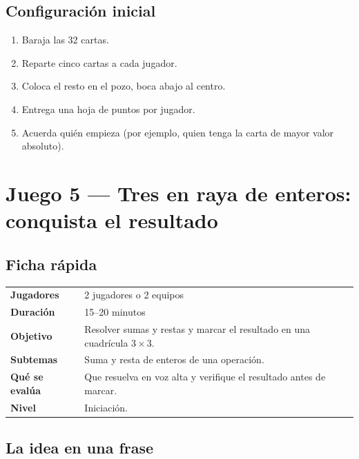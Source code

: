 \documentclass[12pt, letterpaper]{article}
\begin{document}
\subsection{Configuración inicial}

\begin{enumerate}[leftmargin=*]
  \item Baraja las 32 cartas.
  \item Reparte cinco cartas a cada jugador.
  \item Coloca el resto en el pozo, boca abajo al centro.
  \item Entrega una hoja de puntos por jugador.
  \item Acuerda quién empieza (por ejemplo, quien tenga la carta de mayor valor absoluto).
\end{enumerate}

\clearpage
\section{Juego 5 — Tres en raya de enteros: conquista el resultado}

\subsection{Ficha rápida}

\begin{center}
\small
\begin{tabular}{@{}p{3cm} p{12.2cm}@{}}
\toprule
\textbf{Jugadores} & 2 jugadores o 2 equipos\\
\textbf{Duración} & 15--20 minutos\\
\textbf{Objetivo} & Resolver sumas y restas y marcar el resultado en una cuadrícula $3\times 3$.\\
\textbf{Subtemas} & Suma y resta de enteros de una operación.\\
\textbf{Qué se evalúa} & Que resuelva en voz alta y verifique el resultado antes de marcar.\\
\textbf{Nivel} & Iniciación.\\
\bottomrule
\end{tabular}
\end{center}

\subsection{La idea en una frase}
\end{document}
